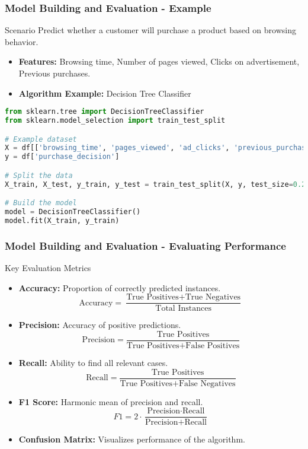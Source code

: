 \documentclass{beamer}
\begin{document}
\begin{frame}[fragile]
    \frametitle{Model Building and Evaluation - Example}
    \begin{block}{Scenario}
        Predict whether a customer will purchase a product based on browsing behavior.
    \end{block}

    \begin{itemize}
        \item \textbf{Features:} Browsing time, Number of pages viewed, Clicks on advertisement, Previous purchases.
        \item \textbf{Algorithm Example:} Decision Tree Classifier
    \end{itemize}

    \begin{lstlisting}[language=Python]
from sklearn.tree import DecisionTreeClassifier
from sklearn.model_selection import train_test_split

# Example dataset
X = df[['browsing_time', 'pages_viewed', 'ad_clicks', 'previous_purchases']]
y = df['purchase_decision']

# Split the data
X_train, X_test, y_train, y_test = train_test_split(X, y, test_size=0.2, random_state=42)

# Build the model
model = DecisionTreeClassifier()
model.fit(X_train, y_train)
    \end{lstlisting}
\end{frame}

\begin{frame}[fragile]
    \frametitle{Model Building and Evaluation - Evaluating Performance}
    \begin{block}{Key Evaluation Metrics}
        \begin{itemize}
            \item \textbf{Accuracy:} Proportion of correctly predicted instances. 
                \[
                \text{Accuracy} = \frac{\text{True Positives} + \text{True Negatives}}{\text{Total Instances}}
                \]
            \item \textbf{Precision:} Accuracy of positive predictions.
                \[
                \text{Precision} = \frac{\text{True Positives}}{\text{True Positives} + \text{False Positives}}
                \]
            \item \textbf{Recall:} Ability to find all relevant cases.
                \[
                \text{Recall} = \frac{\text{True Positives}}{\text{True Positives} + \text{False Negatives}}
                \]
            \item \textbf{F1 Score:} Harmonic mean of precision and recall.
                \[
                F1 = 2 \cdot \frac{\text{Precision} \cdot \text{Recall}}{\text{Precision} + \text{Recall}}
                \]
            \item \textbf{Confusion Matrix:} Visualizes performance of the algorithm.
        \end{itemize}
    \end{block}
\end{frame}
\end{document}
